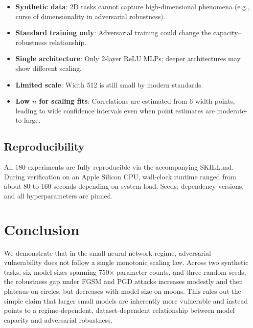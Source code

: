 \documentclass[11pt,a4paper]{article}
\begin{document}
\begin{itemize}
    \item \textbf{Synthetic data}: 2D tasks cannot capture high-dimensional phenomena
          (e.g., curse of dimensionality in adversarial robustness).
    \item \textbf{Standard training only}: Adversarial training could change the
          capacity--robustness relationship.
    \item \textbf{Single architecture}: Only 2-layer ReLU MLPs; deeper architectures
          may show different scaling.
    \item \textbf{Limited scale}: Width 512 is still small by modern standards.
    \item \textbf{Low $n$ for scaling fits}: Correlations are estimated from 6 width points,
          leading to wide confidence intervals even when point estimates are moderate-to-large.
\end{itemize}

\subsection{Reproducibility}

All 180 experiments are fully reproducible via the accompanying SKILL.md.
During verification on an Apple Silicon CPU, wall-clock runtime ranged from about
80 to 160 seconds depending on system load.
Seeds, dependency versions, and all hyperparameters are pinned.

\section{Conclusion}

We demonstrate that in the small neural network regime, adversarial vulnerability
does not follow a single monotonic scaling law.
Across two synthetic tasks, six model sizes spanning 750$\times$ parameter counts,
and three random seeds, the robustness gap under FGSM and PGD attacks increases modestly
and then plateaus on circles, but decreases with model size on moons.
This rules out the simple claim that larger small models are inherently more vulnerable
and instead points to a regime-dependent, dataset-dependent relationship between model
capacity and adversarial robustness.
\end{document}

